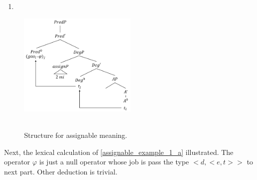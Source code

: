 \documentclass{ctexart}
\begin{document}
\begin{enumerate}
    \item \label{assignable_example_1_a_transitive_tree}
\end{enumerate}

\begin{figure}[H]
    \centering
    \includegraphics[width=0.5\textwidth]{pic/assignment_meaning_transitive.png}
    \begin{caption}
        \\ \vspace{-1.1ex}
        Structure for assignable meaning.
    \end{caption}
\end{figure}

Next, the lexical calculation of \ref{assignable_example_1_a} illustrated. The operator $\varphi$ is just a null operator whose job is pass the type $<d,<e,t>>$ to next part. Other deduction is trivial.
\end{document}
